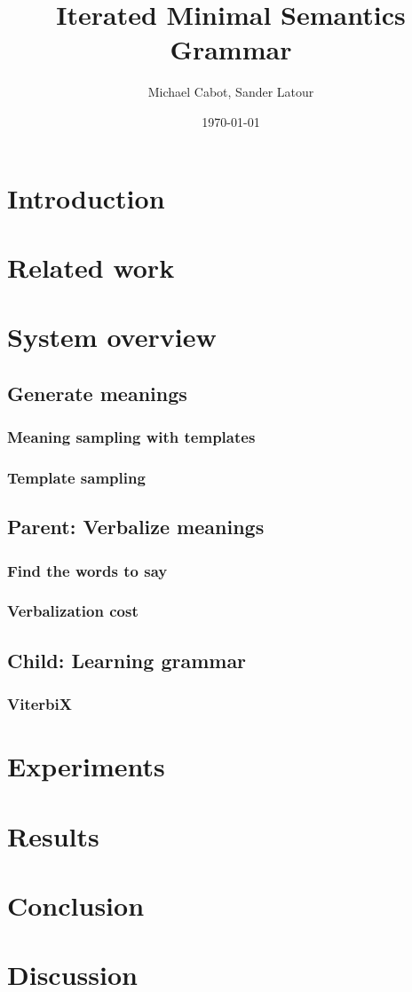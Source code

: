 \documentclass[a4paper]{article}
\begin{document}
\author{Michael Cabot,  Sander Latour}
\title{Iterated Minimal Semantics Grammar}

\date{\today}

\maketitle

\section{Introduction}
\cite{zuidema2003poverty} \cite{batali1999negotiation}
\section{Related work}
\section{System overview}
\subsection{Generate meanings}
\subsubsection{Meaning sampling with templates}
\subsubsection{Template sampling}
\subsection{Parent: Verbalize meanings}
\subsubsection{Find the words to say}
\subsubsection{Verbalization cost}
\subsection{Child: Learning grammar} %
\subsubsection{ViterbiX} %
\section{Experiments}
\section{Results}
\section{Conclusion}
\section{Discussion}



\end{document}
